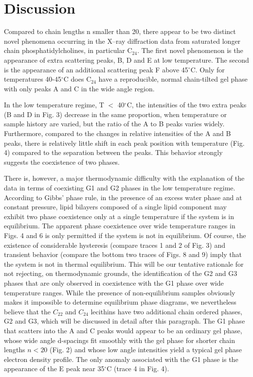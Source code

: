 \section{Discussion}

Compared to chain lengths n smaller than 20,
there appear to be two distinct novel phenomena occurring in the 
X--ray diffraction data from saturated longer chain phosphatidylcholines, in
particular C$_{24}$.  The first novel phenomenon is the appearance of extra 
scattering peaks, B, D and E at low temperature. 
The second is the appearance of an additional scattering peak F above 
45$^{\circ}$C. Only for temperatures 40-45$^{\circ }$C does C$_{24}$ have a 
reproducible, normal chain-tilted gel phase with only peaks A and C in the wide 
angle region.

In the low temperature regime, T $<$ 40$^{\circ }$C,
the intensities of the two extra peaks (B and D in Fig. 3) decrease
in the same proportion, when temperature or sample history are varied, 
but the ratio of the A to B peaks varies widely.  Furthermore, compared to the
changes in relative intensities of the A and B peaks, there is relatively 
little shift in each peak position with temperature (Fig. 4) compared to
the separation between the peaks.  This behavior strongly suggests the
coexistence of two phases. 

There is, however, a major thermodynamic difficulty with the explanation of the
data in terms of coexisting G1 and G2 phases in the low temperature
regime.  According to Gibbs' phase rule, in the presence of an excess
water phase and at constant pressure, lipid bilayers composed of a single
lipid component may exhibit two phase coexistence only at a single temperature 
if the system is in equilibrium.  The apparent phase coexistence over
wide temperature ranges in Figs. 4 and 6 is only permitted if the system is 
not in equilibrium.  Of course, the existence of 
considerable hysteresis (compare traces 1 and 2 of Fig. 3) and
transient behavior (compare the bottom two traces of Figs. 8 and 9) imply
that the system is not in thermal equilibrium. This will be our tentative
rationale for not rejecting, on thermodynamic
grounds, the identification of the G2 and G3 phases that are only
observed in coexistence with the G1 phase over wide temperature ranges.
While the presence of non-equilibrium samples obviously
makes it impossible to determine
equilibrium phase diagrams, we nevertheless believe that the $C_{22}$ and
$C_{24}$ lecithins have two additional chain ordered phases, G2 and G3,
which will be discussed in detail after this paragraph.
The G1 phase that scatters into the A and C peaks would
appear to be an ordinary gel phase, whose wide angle d-spacings fit
smoothly with the gel phase for shorter chain lengths $n < 20$ 
(Fig. 2) and whose low angle intensities yield a typical gel phase electron
density profile.  The only anomaly associated with the G1 phase is the
appearance of the E peak near 35$^{\circ }$C (trace 4 in Fig. 4).

